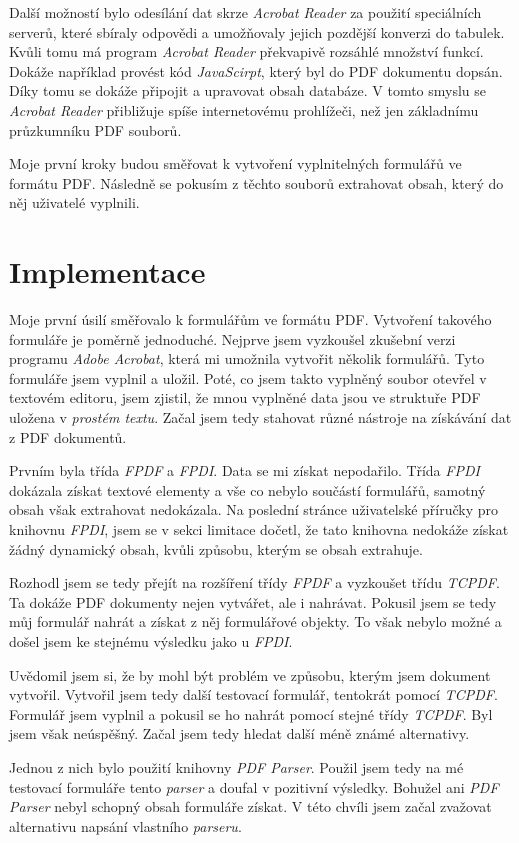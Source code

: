 \documentclass[czech,BP]{thesiskiv}
\begin{document}
Další možností bylo odesílání dat skrze \emph{Acrobat Reader} za použití speciálních serverů, které sbíraly odpovědi a umožňovaly jejich pozdější konverzi do tabulek. Kvůli tomu má program \emph{Acrobat Reader} překvapivě rozsáhlé množství funkcí. Dokáže například provést kód \emph{JavaScirpt}, který byl do PDF dokumentu dopsán. Díky tomu se dokáže připojit a upravovat obsah databáze. V tomto smyslu se \emph{Acrobat Reader} přibližuje spíše internetovému prohlížeči, než jen základnímu průzkumníku PDF souborů. 

Moje první kroky budou směřovat k vytvoření vyplnitelných formulářů ve formátu PDF. Následně se pokusím z těchto souborů extrahovat obsah, který do něj uživatelé vyplnili. 
\chapter{Implementace}
Moje první úsilí směřovalo k formulářům ve formátu PDF. Vytvoření takového formuláře je poměrně jednoduché. Nejprve jsem vyzkoušel zkušební verzi programu \emph{Adobe Acrobat}, která mi umožnila vytvořit několik formulářů. Tyto formuláře jsem vyplnil a uložil. Poté, co jsem takto vyplněný soubor otevřel v textovém editoru, jsem zjistil, že mnou vyplněné data jsou ve struktuře PDF uložena v \emph{prostém textu}. Začal jsem tedy stahovat různé nástroje na získávání dat z PDF dokumentů. 

Prvním byla třída \emph{FPDF} a \emph{FPDI}. Data se mi získat nepodařilo. Třída \emph{FPDI} dokázala získat textové elementy a vše co nebylo součástí formulářů, samotný obsah však extrahovat nedokázala. Na poslední stránce uživatelské příručky pro knihovnu \emph{FPDI}, jsem se v sekci limitace dočetl, že tato knihovna nedokáže získat žádný dynamický obsah, kvůli způsobu, kterým se obsah extrahuje. 

Rozhodl jsem se tedy přejít na rozšíření třídy \emph{FPDF} a vyzkoušet třídu \emph{TCPDF}. Ta dokáže PDF dokumenty nejen vytvářet, ale i nahrávat. Pokusil jsem se tedy můj formulář nahrát a získat z něj formulářové objekty. To však nebylo možné a došel jsem ke stejnému výsledku jako u \emph{FPDI}. 

Uvědomil jsem si, že by mohl být problém ve způsobu, kterým jsem dokument vytvořil. Vytvořil jsem tedy další testovací formulář, tentokrát pomocí \emph{TCPDF}. Formulář jsem vyplnil a pokusil se ho nahrát pomocí stejné třídy \emph{TCPDF}. Byl jsem však neúspěšný. Začal jsem tedy hledat další méně známé alternativy. 

Jednou z nich bylo použití knihovny \emph{PDF Parser}. Použil jsem tedy na mé testovací formuláře tento \emph{parser} a doufal v pozitivní výsledky. Bohužel ani \emph{PDF Parser} nebyl schopný obsah formuláře získat. V této chvíli jsem začal zvažovat alternativu napsání vlastního \emph{parseru}. 
\end{document}
